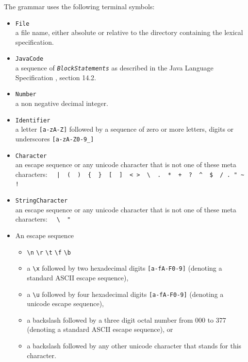 \documentclass[11pt]{scrartcl}
\newcommand{\trit}{\em}
\begin{document}
\label{Terminals}
The grammar uses the following terminal symbols:   
\begin{itemize}
\item \texttt{File}\\
  a file name, either absolute or relative to the directory containing 
  the lexical specification.

\item \texttt{JavaCode}\\
  a sequence of {\trit \texttt{BlockStatements}} as described in the Java
  Language Specification \cite{LangSpec}, section 14.2.

\item \texttt{Number}\\
  a non negative decimal integer.
  
\item \texttt{Identifier}\\
  a letter \verb+[a-zA-Z]+ followed by a sequence of zero or more
  letters, digits or underscores \verb+[a-zA-Z0-9_]+

\item \texttt{Character}\\
  an escape sequence or any unicode character that is not one of these
  meta characters:
  \verb:  |  (  )  {  }  [  ]  < >  \  .  *  +  ?  ^  $  / . " ~ !:

\item \texttt{StringCharacter}\\   
  an escape sequence or any unicode character that is not one of these
  meta characters:
  \verb:  \  ":

\item
  An escape sequence

  \begin{itemize}
  \item
    \verb+\n+  \verb+\r+  \verb+\t+  \verb+\f+  \verb+\b+
  \item
    a \verb+\x+ followed by two hexadecimal digits \texttt{[a-fA-F0-9]} (denoting
    a standard ASCII escape sequence),
    
  \item
    a \verb+\u+ followed by four hexadecimal digits \texttt{[a-fA-F0-9]}
    (denoting a unicode escape sequence),

  \item
    a backslash followed by a three digit octal number from 000 to 377 (denoting
    a standard ASCII escape sequence), or

  \item
    a backslash followed by any other unicode character that stands for this
    character.

  \end{itemize}
  
\end{itemize}
\end{document}
